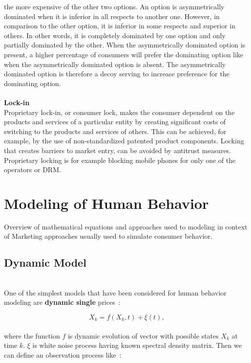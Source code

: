the more expensive of the other two options.
An option is asymmetrically dominated when it is inferior in all respects to another one.
However, in comparison to the other option, it is inferior in some respects and superior in others.
In other words, it is completely dominated by one option and only partially dominated by the other.
When the asymmetrically dominated option is present, a higher
percentage of consumers will prefer the dominating option like when the asymmetrically dominated option is absent.
The asymmetrically dominated option is therefore a decoy serving to increase preference for the dominating option.\\
\\
\textbf{Lock-in} \label{subsec:lock-in}\\
Proprietary lock-in, or consumer lock, makes the consumer dependent on the products and services of a particular entity
by creating significant costs of switching to the products and services of others.
This can be achieved, for example,
by the use of non-standardized patented product components.
Locking that creates barriers to market entry, can be avoided by antitrust measures.
Proprietary locking is for example blocking mobile phones for only one of the operators or DRM.
\\
\section{Modeling of Human Behavior} \label{sec:modeling}
Overview of mathematical equations and approaches used to modeling in context of Marketing approaches usually used to simulate consumer behavior.
\subsection{Dynamic Model} \label{subsec:dynamicModel}\\
One of the simplest models that have been considered for human behavior modeling are \textbf{dynamic single} prices~\cite{pantland}:

\begin{equation} \label{eq:1}
X_k = f(X_k, t) + \xi(t),
\end{equation}
\\
where the function $f$ is dynamic evolution of vector with possible states $X_k$ at time $k$. $\xi$ is white noise process having known spectral density matrix.
Then we can define an observation process like~\cite{pantland}:

